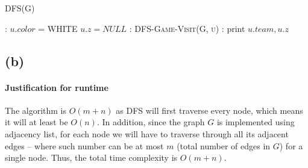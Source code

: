 \documentclass[11pt]{article}
\begin{document}
\begin{algorithm}[H]
\caption{DFS(G)}
    \begin{algorithmic}[1]
        :
            \State $u.color$ = WHITE
            \State $u.z = NULL$
        \EndFor
        :
                \State \textsc{DFS-Game-Visit(G, u)}
            \EndIf
        \EndFor
        :
            \State print $u.team, u.z$ 
        \EndFor
    \end{algorithmic}
\end{algorithm}



\subsection{(b)}

\paragraph{Justification for runtime} The algorithm is $O(m+n)$ as DFS will first traverse every node, which means it will at least be $O(n)$. In addition, since the graph $G$ is implemented using adjacency list, for each node we will have to traverse through all its adjacent edges -- where such number can be at most $m$ (total number of edges in $G$) for a single node. Thus, the total time complexity is $O(m + n)$.
\end{document}
